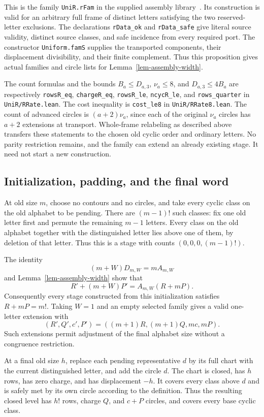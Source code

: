 This is the family \texttt{UniR.rFam} in the supplied assembly
library~\cite{halfar-assembly}. Its construction is valid for an
arbitrary full frame of distinct letters satisfying the two reserved-letter
exclusions. The declarations \texttt{rData\_ok} and
\texttt{rData\_safe} give literal source validity, distinct source classes,
and safe incidence from every required port. The constructor
\texttt{Uniform.famS} supplies the transported components, their
displacement divisibility, and their finite complement. Thus this
proposition gives actual families and circle lists for
Lemma~\ref{lem-assembly-width}.

The count formulas and the bounds $B_a\le D_{a,3}$, $\nu_a\le8$, and
$D_{a,3}\le4B_a$ are respectively \texttt{rowsR\_eq}, \texttt{chargeR\_eq},
\texttt{rowsR\_le}, \texttt{ncycR\_le}, and
\texttt{rows\_quarter} in \texttt{UniR/RRate.lean}.
The cost inequality is \texttt{cost\_le8} in
\texttt{UniR/RRate8.lean}. The count of advanced circles is
$(a+2)\nu_a$, since each of the original $\nu_a$ circles has $a+2$
extensions at transport. Whole-frame relabeling as described above
transfers these statements to the chosen old cyclic order and ordinary
letters. No parity restriction remains, and the family can extend an
already existing stage. It need not start a new construction.

\subsection{Initialization, padding, and the final word}

At old size $m$, choose no contours and no circles, and take every cyclic
class on the old alphabet to be pending. There are $(m-1)!$ such classes:
fix one old letter first and permute the remaining $m-1$ letters. Every
class on the old alphabet together with the distinguished letter lies
above one of them, by deletion of that letter. Thus this is a stage
with counts $(0,0,0,(m-1)!)$.

The identity
\[
 (m+W)D_{m,W}=mA_{m,W}
\]
and Lemma~\ref{lem-assembly-width} show that
\[
 R'+(m+W)P'=A_{m,W}(R+mP).
\]
Consequently every stage constructed from this initialization satisfies
$R+mP=m!$. Taking $W=1$ and an empty selected family gives a valid
one-letter extension with
\[
 (R',Q',c',P')=((m+1)R,(m+1)Q,mc,mP).
\]
Such extensions permit adjustment of the final alphabet size without a
congruence restriction.

At a final old size $h$, replace each pending representative $d$ by its
full chart with the current distinguished letter, and add the circle
$d$. The chart is closed, has $h$ rows, has zero charge, and has
displacement $-h$. It covers every class above $d$ and is safely met by
its own circle according to the definition. Thus the resulting closed
level has $h!$ rows, charge $Q$, and $c+P$ circles, and covers every base
cyclic class.

